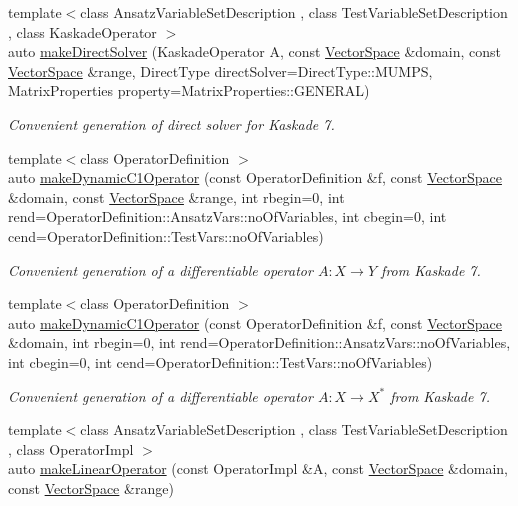 \begin{DoxyCompactItemize}
{\footnotesize template$<$class Ansatz\+Variable\+Set\+Description , class Test\+Variable\+Set\+Description , class Kaskade\+Operator $>$ }\\auto \hyperlink{namespaceSpacy_1_1Kaskade_a9ee22f7d702c4cfc68786dd821dddd56}{make\+Direct\+Solver} (Kaskade\+Operator A, const \hyperlink{classSpacy_1_1VectorSpace}{Vector\+Space} \&domain, const \hyperlink{classSpacy_1_1VectorSpace}{Vector\+Space} \&range, Direct\+Type direct\+Solver=Direct\+Type\+::\+M\+U\+M\+P\+S, Matrix\+Properties property=Matrix\+Properties\+::\+G\+E\+N\+E\+R\+A\+L)
\begin{DoxyCompactList}\small\item\em Convenient generation of direct solver for Kaskade 7. \end{DoxyCompactList}\item 
{\footnotesize template$<$class Operator\+Definition $>$ }\\auto \hyperlink{namespaceSpacy_1_1Kaskade_ac4502ad2f54b2c7d82e2a5d5790dc8b6}{make\+Dynamic\+C1\+Operator} (const Operator\+Definition \&f, const \hyperlink{classSpacy_1_1VectorSpace}{Vector\+Space} \&domain, const \hyperlink{classSpacy_1_1VectorSpace}{Vector\+Space} \&range, int rbegin=0, int rend=Operator\+Definition\+::\+Ansatz\+Vars\+::no\+Of\+Variables, int cbegin=0, int cend=Operator\+Definition\+::\+Test\+Vars\+::no\+Of\+Variables)
\begin{DoxyCompactList}\small\item\em Convenient generation of a differentiable operator $A: X\rightarrow Y$ from Kaskade 7. \end{DoxyCompactList}\item 
{\footnotesize template$<$class Operator\+Definition $>$ }\\auto \hyperlink{namespaceSpacy_1_1Kaskade_acb385469fa2c1465b9ed8cbe6fabc13c}{make\+Dynamic\+C1\+Operator} (const Operator\+Definition \&f, const \hyperlink{classSpacy_1_1VectorSpace}{Vector\+Space} \&domain, int rbegin=0, int rend=Operator\+Definition\+::\+Ansatz\+Vars\+::no\+Of\+Variables, int cbegin=0, int cend=Operator\+Definition\+::\+Test\+Vars\+::no\+Of\+Variables)
\begin{DoxyCompactList}\small\item\em Convenient generation of a differentiable operator $A: X\rightarrow X^*$ from Kaskade 7. \end{DoxyCompactList}\item 
{\footnotesize template$<$class Ansatz\+Variable\+Set\+Description , class Test\+Variable\+Set\+Description , class Operator\+Impl $>$ }\\auto \hyperlink{namespaceSpacy_1_1Kaskade_a6bd8e1d7fdd3066ecd7ed14f0a239912}{make\+Linear\+Operator} (const Operator\+Impl \&A, const \hyperlink{classSpacy_1_1VectorSpace}{Vector\+Space} \&domain, const \hyperlink{classSpacy_1_1VectorSpace}{Vector\+Space} \&range)

\end{DoxyCompactItemize}
